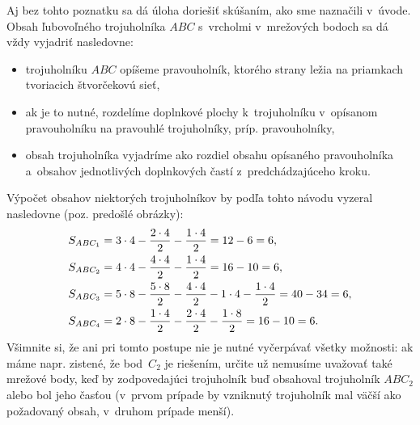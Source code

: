 {Aj bez tohto poznatku sa dá úloha doriešiť skúšaním, ako sme naznačili v~úvode.
Obsah ľubovoľného trojuholníka $ABC$ s~vrcholmi v~mrežových bodoch sa dá vždy
vyjadriť nasledovne:
\begin{itemize}
\item trojuholníku $ABC$ opíšeme pravouholník, ktorého strany ležia na
priamkach tvoriacich štvorčekovú sieť,
\item ak je to nutné, rozdelíme doplnkové plochy k~trojuholníku v~opísanom pravouholníku na pravouhlé trojuholníky, príp. pravouholníky,
\item obsah trojuholníka vyjadríme ako rozdiel obsahu opísaného
pravouholníka a~obsahov jednotlivých doplnkových častí z~predchádzajúceho
kroku.
\end{itemize}
Výpočet obsahov niektorých trojuholníkov by podľa tohto návodu vyzeral
nasledovne (poz. predošlé obrázky):
$$
\aligned
S_{ABC_1}&=3\cdot4-\frac{2\cdot4}2-\frac{1\cdot4}2=12-6=6,\\
S_{ABC_2}&=4\cdot4-\frac{4\cdot4}2-\frac{1\cdot4}2=16-10=6,\\
S_{ABC_3}&=5\cdot8-\frac{5\cdot8}2-\frac{4\cdot4}2-1\cdot4-\frac{1\cdot4}2=40-34=6,\\
S_{ABC_4}&=2\cdot8-\frac{1\cdot4}2-\frac{2\cdot4}2-\frac{1\cdot8}2=16-10=6.
\endaligned
$$
Všimnite si, že ani pri tomto postupe nie je nutné vyčerpávať všetky
možnosti:
ak máme napr. zistené, že bod~$C_2$ je riešením, určite už nemusíme uvažovať
také mrežové body,
keď by zodpovedajúci trojuholník buď obsahoval trojuholník $ABC_2$ alebo bol jeho časťou
(v~prvom prípade by vzniknutý trojuholník mal väčší ako požadovaný obsah, v~druhom prípade menší).}

